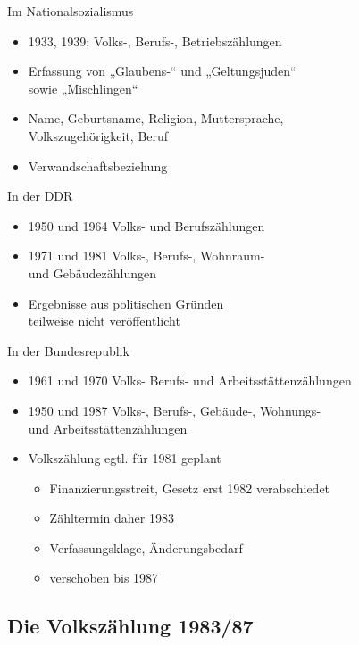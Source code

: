 \documentclass[ignorenonframetext,ucs]{beamer}
\begin{document}
\begin{frame}{Im Nationalsozialismus}\begin{itemize}
\item 1933, 1939; Volks-, Berufs-, Betriebszählungen
\item Erfassung von „Glaubens-“ und „Geltungsjuden“\\sowie „Mischlingen“
\item Name, Geburtsname, Religion, Muttersprache,\\Volkszugehörigkeit, Beruf
\item Verwandschaftsbeziehung
\end{itemize}\end{frame}

\begin{frame}{In der DDR}\begin{itemize}
\item 1950 und 1964 Volks- und Berufszählungen
\item 1971 und 1981 Volks-, Berufs-, Wohnraum-\\und Gebäudezählungen
\item Ergebnisse aus politischen Gründen\\teilweise nicht veröffentlicht
\end{itemize}\end{frame}

\begin{frame}{In der Bundesrepublik}\begin{itemize}
\item 1961 und 1970 Volks- Berufs- und Arbeitsstättenzählungen
\item 1950 und 1987 Volks-, Berufs-, Gebäude-, Wohnungs-\\und Arbeitsstättenzählungen
\item Volkszählung egtl. für 1981 geplant\begin{itemize}
	\item Finanzierungsstreit, Gesetz erst 1982 verabschiedet
	\item Zähltermin daher 1983
	\item Verfassungsklage, Änderungsbedarf
	\item verschoben bis 1987
\end{itemize}
\end{itemize}\end{frame}

\subsection{Die Volkszählung 1983/87}
\end{document}
